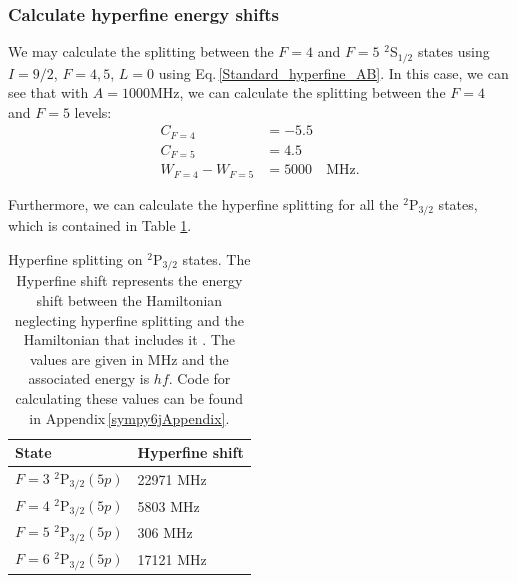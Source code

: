 \subsubsection{Calculate hyperfine energy shifts}
We may calculate the splitting between the $F=4$ and $F=5$ $^2$S$_{1/2}$ states using $I=9/2$, $F=4,5$, $L=0$ using Eq.\,\ref{Standard_hyperfine_AB}. In this case, we can see that with $A=1000$MHz, we can calculate the splitting between the $F=4$ and $F=5$ levels: 
\begin{align}
C_{F=4} &= -5.5\\
C_{F=5} &= 4.5\\
W_{F=4}-W_{F=5}&=5000 \quad \mathrm{MHz}.
\end{align}

Furthermore, we can calculate the hyperfine splitting for all the $^2$P$_{3/2}$ states, which is contained in Table \ref{tableOfHyperfinedeetuings}.


\begin{table}[h]
\centering
\begin{tabular}{|l|l|}
\hline
State & Hyperfine shift  \\ \hline \hline
$F=3$ $^2$P$_{3/2} (5p)$ & 22971  MHz\\ \hline
$F=4$ $^2$P$_{3/2} (5p)$ &  5803 MHz\\ \hline
$F=5$ $^2$P$_{3/2} (5p)$ &  306 MHz\\ \hline
$F=6$ $^2$P$_{3/2} (5p)$ &   17121 MHz\\ \hline
\end{tabular}
\caption{Hyperfine splitting on $^2$P$_{3/2}$ states. The Hyperfine shift represents the energy shift between the Hamiltonian neglecting hyperfine splitting and the Hamiltonian that includes it
. The values are given in MHz and the associated energy is $hf$. Code for calculating these values can be found in Appendix\,\ref{sympy6jAppendix}.}
\label{tableOfHyperfinedeetuings}
\end{table}

